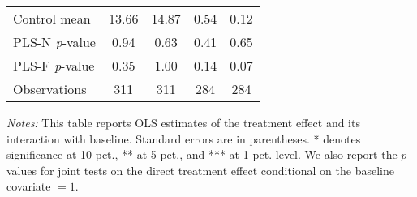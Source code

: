 \begin{table}[ht]
{\begin{threeparttable}
\begin{tabular}{l*{4}{c}}
Control mean    &    13.66         &    14.87         &     0.54         &     0.12         \\
PLS-N \emph{p}-value&     0.94         &     0.63         &     0.41         &     0.65         \\
PLS-F \emph{p}-value&     0.35         &     1.00         &     0.14         &     0.07         \\
Observations    &      311         &      311         &      284         &      284         \\
\bottomrule \end{tabular} \begin{tablenotes}[flushleft] \footnotesize \item \emph{Notes:} This table reports OLS estimates of the treatment effect and its interaction with baseline. Standard errors are in parentheses. * denotes significance at 10 pct., ** at 5 pct., and *** at 1 pct. level. We also report the \(p\)-values for joint tests on the direct treatment effect conditional on the baseline covariate $= 1$. \end{tablenotes} \end{threeparttable} } \end{table}

